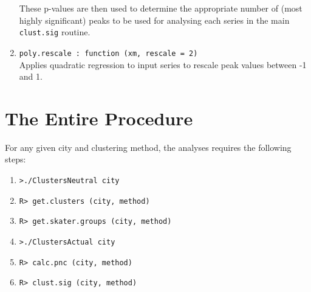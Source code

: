 \documentclass[a4paper,oneside]{article}
\begin{document}
\begin{enumerate}
        These p-values are then used to determine the appropriate number of (most highly significant) peaks to be used for analysing each series
        in the main {\tt clust.sig} routine.
    \item {\tt poly.rescale : function (xm, rescale = 2)}\\
        Applies quadratic regression to input series to rescale peak values between -1 and 1.
\end{enumerate}


\section{The Entire Procedure}

For any given city and clustering method, the analyses requires the following steps:
\begin{enumerate}
    \item {\tt >./ClustersNeutral city}
    \item {\tt R> get.clusters (city, method)}
    \item {\tt R> get.skater.groups (city, method)}
    \item {\tt >./ClustersActual city}
    \item {\tt R> calc.pnc (city, method)}
    \item {\tt R> clust.sig (city, method)}
\end{enumerate}
\end{document}
